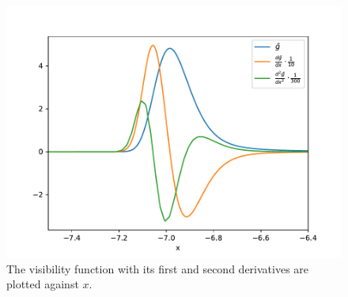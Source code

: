 \documentclass{aa}
\begin{document}
\begin{figure}[h!]
   \includegraphics[scale=0.5]{../figures/milestone2/g_tilde_plots.pdf}
   \caption{The visibility function with its first and second derivatives are plotted against $x$.}\label{fig:M2:g_tilde_plots}
\end{figure}
\end{document}
